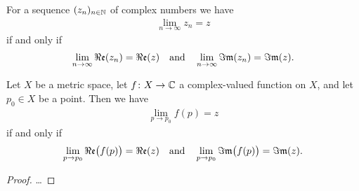 \begin{lemma}
  \label{lem:complex_limit}
  For a sequence $(z_n)_{n \in \mathbb{N}}$ of complex numbers
  we have
  \begin{align*}
    \lim_{n \to \infty} z_n = z
  \end{align*}
  if and only if
  \begin{align*}
    \lim_{n \to \infty} \Re\mathfrak{e}(z_n) = \Re\mathfrak{e}(z)
    \quad \text{and} \quad
    \lim_{n \to \infty} \Im\mathfrak{m}(z_n) = \Im\mathfrak{m}(z) .
  \end{align*}

  Let $X$ be a metric space,
  let $f \colon X \to \mathbb{C}$ a complex-valued
  function on $X$, and
  let $p_0 \in X$ be a point. Then we have
  \begin{align*}
    \lim_{p \to p_0} f(p) = z
  \end{align*}
  if and only if
  \begin{align*}
    \lim_{p \to p_0} \Re\mathfrak{e} \big( f(p) \big) = \Re\mathfrak{e}(z)
    \quad \text{and} \quad
    \lim_{p \to p_0} \Im\mathfrak{m} \big( f(p) \big) = \Im\mathfrak{m}(z) .
  \end{align*}
\end{lemma}
\begin{proof}
  \ldots
\end{proof}

